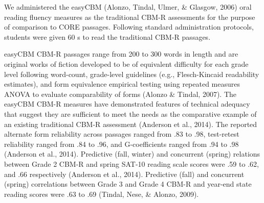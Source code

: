 \documentclass[
  english,
  man, fleqn, noextraspace]{apa6}
\begin{document}
We administered the easyCBM (Alonzo, Tindal, Ulmer, \& Glasgow, 2006) oral reading fluency measures as the traditional CBM-R assessments for the purpose of comparison to CORE passages. Following standard administration protocols, students were given 60 s to read the traditional CBM-R passages.

easyCBM CBM-R passages range from 200 to 300 words in length and are original works of fiction developed to be of equivalent difficulty for each grade level following word-count, grade-level guidelines (e.g., Flesch-Kincaid readability estimates), and form equivalence empirical testing using repeated measures ANOVA to evaluate comparability of forms (Alonzo \& Tindal, 2007). The easyCBM CBM-R measures have demonstrated features of technical adequacy that suggest they are sufficient to meet the needs as the comparative example of an existing traditional CBM-R assessment (Anderson et al., 2014). The reported alternate form reliability across passages ranged from .83 to .98, test-retest reliability ranged from .84 to .96, and G-coefficients ranged from .94 to .98 (Anderson et al., 2014). Predictive (fall, winter) and concurrent (spring) relations between Grade 2 CBM-R and spring SAT-10 reading scale scores were .59 to .62, and .66 respectively (Anderson et al., 2014). Predictive (fall) and concurrent (spring) correlations between Grade 3 and Grade 4 CBM-R and year-end state reading scores were .63 to .69 (Tindal, Nese, \& Alonzo, 2009).
\end{document}
